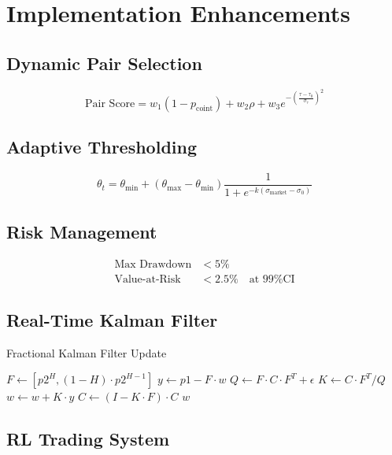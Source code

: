 \documentclass[article]{arithmaxresearch}
\begin{document}
\section{Implementation Enhancements}

\subsection{Dynamic Pair Selection}
\begin{equation}
\text{Pair Score} = w_1(1 - p_{\text{coint}}) + w_2\rho + w_3e^{-\left(\frac{\tau - \tau_0}{\sigma_{\tau}}\right)^2}
\end{equation}

\subsection{Adaptive Thresholding}
\begin{equation}
\theta_t = \theta_{\min} + (\theta_{\max} - \theta_{\min}) \frac{1}{1 + e^{-k(\sigma_{\text{market}} - \sigma_0)}}
\end{equation}

\subsection{Risk Management}
\begin{align}
\text{Max Drawdown} &< 5\% \\
\text{Value-at-Risk} &< 2.5\% \quad \text{at 99\% CI}
\end{align}

\subsection{Real-Time Kalman Filter}

\begin{algorithm}[h]
\caption{Fractional Kalman Filter Update}
\label{alg:kalman}
\begin{algorithmic}[1]
    \State $F \gets [p2^H, (1-H) \cdot p2^{H-1}]$
    \State $y \gets p1 - F \cdot w$
    \State $Q \gets F \cdot C \cdot F^T + \epsilon$
    \State $K \gets C \cdot F^T / Q$
    \State $w \gets w + K \cdot y$
    \State $C \gets (I - K \cdot F) \cdot C$
    \State \Return $w$
\EndFunction
\end{algorithmic}
\end{algorithm}

\subsection{RL Trading System}
\end{document}
